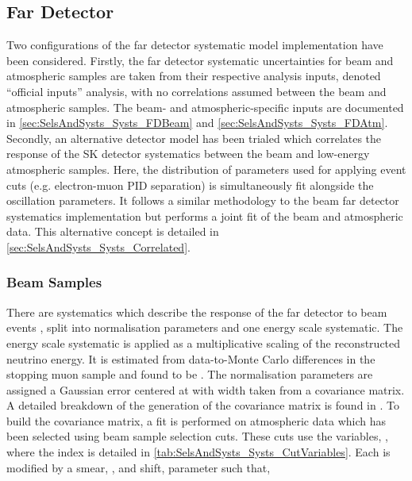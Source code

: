 \subsection{Far Detector}
\label{sec:SelsAndSysts_Systs_FD}

Two configurations of the far detector systematic model implementation have been considered. Firstly, the far detector systematic uncertainties for beam and atmospheric samples are taken from their respective analysis inputs, denoted ``official inputs'' analysis, with no correlations assumed between the beam and atmospheric samples. The beam- and atmospheric-specific inputs are documented in \autoref{sec:SelsAndSysts_Systs_FDBeam} and \autoref{sec:SelsAndSysts_Systs_FDAtm}. Secondly, an alternative detector model has been trialed which correlates the response of the SK detector systematics between the beam and low-energy atmospheric samples. Here, the distribution of parameters used for applying event cuts (e.g. electron-muon PID separation) is simultaneously fit alongside the oscillation parameters. It follows a similar methodology to the beam far detector systematics implementation but performs a joint fit of the beam and atmospheric data. This alternative concept is detailed in \autoref{sec:SelsAndSysts_Systs_Correlated}.

\subsubsection{Beam Samples}
\label{sec:SelsAndSysts_Systs_FDBeam}


There are  systematics which describe the response of the far detector to beam events \cite{t2k_tn_399}, split into  normalisation parameters and one energy scale systematic. The energy scale systematic is applied as a multiplicative scaling of the reconstructed neutrino energy. It is estimated from data-to-Monte Carlo differences in the stopping muon sample and found to be  \cite{Kamiokande_Collaboration2017-nf}. The normalisation parameters are assigned a Gaussian error centered at  with width taken from a covariance matrix. A detailed breakdown of the generation of the covariance matrix is found in \cite{t2k_tn_318}. To build the covariance matrix, a fit is performed on atmospheric data which has been selected using beam sample selection cuts. These cuts use the variables, , where the index  is detailed in \autoref{tab:SelsAndSysts_Systs_CutVariables}. Each  is modified by a smear, \quickmath{\alpha}, and shift, \quickmath{\beta} parameter such that,

